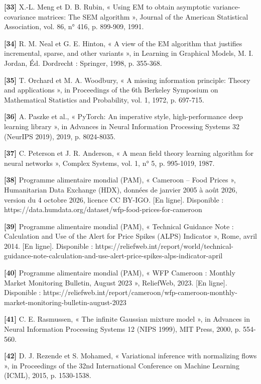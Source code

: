 \textbf{[33]  }X.-L. Meng et D. B. Rubin, « Using EM to obtain asymptotic variance-covariance matrices: The SEM algorithm », Journal of the American Statistical Association, vol. 86, n° 416, p. 899-909, 1991.

\textbf{[34]  }R. M. Neal et G. E. Hinton, « A view of the EM algorithm that justifies incremental, sparse, and other variants », in Learning in Graphical Models, M. I. Jordan, Éd. Dordrecht : Springer, 1998, p. 355-368.

\textbf{[35]  }T. Orchard et M. A. Woodbury, « A missing information principle: Theory and applications », in Proceedings of the 6th Berkeley Symposium on Mathematical Statistics and Probability, vol. 1, 1972, p. 697-715.

\textbf{[36]  }A. Paszke et al., « PyTorch: An imperative style, high-performance deep learning library », in Advances in Neural Information Processing Systems 32 (NeurIPS 2019), 2019, p. 8024-8035.

\textbf{[37]  }C. Peterson et J. R. Anderson, « A mean field theory learning algorithm for neural networks », Complex Systems, vol. 1, n° 5, p. 995-1019, 1987.

\textbf{[38]  }Programme alimentaire mondial (PAM), « Cameroon -- Food Prices », Humanitarian Data Exchange (HDX), données de janvier 2005 à août 2026, version du 4 octobre 2026, licence CC BY-IGO. [En ligne]. Disponible : https://data.humdata.org/dataset/wfp-food-prices-for-cameroon

\textbf{[39]  }Programme alimentaire mondial (PAM), « Technical Guidance Note : Calculation and Use of the Alert for Price Spikes (ALPS) Indicator », Rome, avril 2014. [En ligne]. Disponible : https://reliefweb.int/report/world/technical-guidance-note-calculation-and-use-alert-price-spikes-alps-indicator-april

\textbf{[40]  }Programme alimentaire mondial (PAM), « WFP Cameroon : Monthly Market Monitoring Bulletin, August 2023 », ReliefWeb, 2023. [En ligne]. Disponible : https://reliefweb.int/report/cameroon/wfp-cameroon-monthly-market-monitoring-bulletin-august-2023

\textbf{[41]  }C. E. Rasmussen, « The infinite Gaussian mixture model », in Advances in Neural Information Processing Systems 12 (NIPS 1999), MIT Press, 2000, p. 554-560.

\textbf{[42]  }D. J. Rezende et S. Mohamed, « Variational inference with normalizing flows », in Proceedings of the 32nd International Conference on Machine Learning (ICML), 2015, p. 1530-1538.

